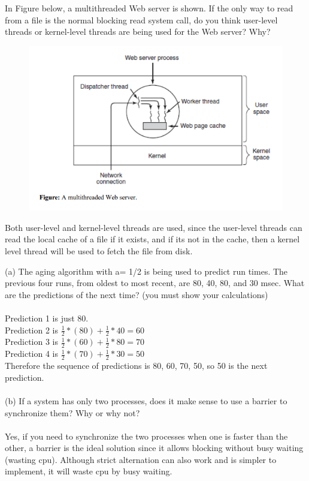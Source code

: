 \documentclass[12pt]{article}
\newenvironment{problem}[2][Problem]{\begin{trivlist}
\item[\hskip \labelsep {\bfseries #1}\hskip \labelsep {\bfseries #2.}]}{\end{trivlist}}
\begin{document}
\begin{problem}{3}
    In Figure below, a multithreaded Web server is shown. If the only way to read from a file is
    the normal blocking read system call, do you think user-level threads or kernel-level threads are being used
    for the Web server? Why?
    \begin{figure}[ht]
        \centering
        \includegraphics[width=\textwidth]{problem3}
    \end{figure}

    Both user-level and kernel-level threads are used, since the user-level threads can read the local cache of a file if it exists, and if its not in the cache, then a kernel level thread will be used to fetch the file from disk.
\end{problem}

\begin{problem}{4}
    (a) The aging algorithm with a= 1/2 is being used to predict run times. The previous
four runs, from oldest to most recent, are 80, 40, 80, and 30 msec. What are the predictions of the next
time? (you must show your calculations)\\\\
Prediction 1 is just 80.\\
Prediction 2 is $\frac{1}{2}*(80) + \frac{1}{2}*40 = 60$\\
Prediction 3 is $\frac{1}{2}*(60) + \frac{1}{2}*80 = 70$\\
Prediction 4 is $\frac{1}{2}*(70) + \frac{1}{2}*30 = 50$\\
Therefore the sequence of predictions is 80, 60, 70, 50, so 50 is the next prediction.\\\\
(b) If a system has only two processes, does it make sense to use a barrier to synchronize them? Why or
why not?\\\\
Yes, if you need to synchronize the two processes when one is faster than the other, a barrier is the ideal solution since it allows blocking without busy waiting (wasting cpu). Although strict alternation can also work and is simpler to implement, it will waste cpu by busy waiting.
\end{problem}
\end{document}
